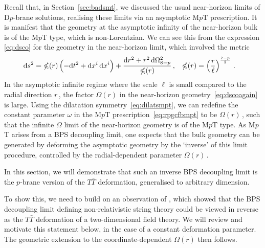 \documentclass[11pt]{article}
\newcommand{\dd}{\mathrm{d}}
\begin{document}
Recall that, in Section~\ref{sec:badsmt}, we discussed the usual near-horizon limits of D$p$-brane solutions, realising these limits via an asymptotic M$p$T prescription.
It is manifest that the geometry at the asymptotic infinity of the near-horizon bulk is of the M$p$T type, which is non-Lorentzian. 
We can see this from the expression \eqref{eq:dsco} for the geometry in the near-horizon limit, which involved the metric
\begin{align}
\label{eq:dscoagain}
    \dd s^2 & = \mathbb{\Omega}(r) \, \Bigl( - \dd t^2 + \dd x^i \, \dd x^i \Bigr) + \frac{\dd r^2 + r^2 \, \dd\Omega^2_{8-p}}{\mathbb{\Omega}(r)}\,, 
        &%
    \mathbb{\Omega}(r) & = \left( \frac{r}{\ell} \right)^{\frac{7-p}{2}}\,.
\end{align} 
In the asymptotic infinite regime where the scale $\ell$ is small compared to the radial direction $r$\,, the factor $\mathbb{\Omega} (r)$ in the near-horizon geometry~\eqref{eq:dscoagain} is large. 
Using the dilatation symmetry~\eqref{eq:dilatsmpt}, we can redefine the constant parameter $\omega$ in the M$p$T prescription~\eqref{eq:rpgcfbmpt} to be $\mathbb{\Omega}(r)$\,, such that the infinite $\mathbb{\Omega}$ limit of the near-horizon geometry is of the M$p$T type. 
As M$p$T arises from a BPS decoupling limit, one expects that the bulk geometry can be generated by deforming the asymptotic geometry by the `inverse' of this limit procedure, controlled by the radial-dependent parameter $\mathbb{\Omega}(r)$\,. 

In this section, we will demonstrate that such an inverse BPS decoupling limit is the $p$-brane version of the $T\bar{T}$ deformation, generalised to arbitrary dimension.

To show this, we need to build on an observation of \cite{Blair:2020ops}, which showed that the BPS decoupling limit defining non-relativistic string theory could be viewed in reverse as the $T \bar T$ deformation of a two-dimensional field theory. 
We will review and motivate this statement below, in the case of a constant deformation parameter. 
The geometric extension to the coordinate-dependent $\mathbb{\Omega}(r)$ then follows.
\end{document}
